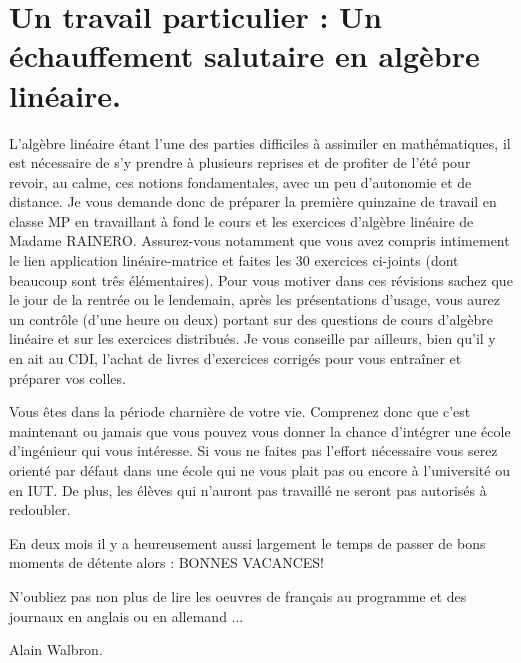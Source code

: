 \section*{Un travail particulier : Un échauffement salutaire en algèbre linéaire.}
L'algèbre linéaire étant l'une des parties difficiles à assimiler en mathématiques, il est nécessaire de s'y prendre
à plusieurs reprises et de profiter de l'été pour revoir, au calme, ces notions fondamentales, avec un peu
d'autonomie et de distance. Je vous demande donc de préparer la première quinzaine de travail en classe
MP en travaillant à fond le cours et les exercices d'algèbre linéaire de Madame RAINERO. Assurez-vous
notamment que vous avez compris intimement le lien application linéaire-matrice et faites les 30 exercices
ci-joints (dont beaucoup sont três élémentaires).
Pour vous motiver dans ces révisions sachez que le jour de la rentrée ou le lendemain, après les présentations
d'usage, vous aurez un contrôle (d'une heure ou deux) portant sur des questions de cours d'algèbre linéaire et
sur les exercices distribués.
Je vous conseille par ailleurs, bien qu'il y en ait au CDI, l'achat de livres d'exercices corrigés pour vous
entraîner et préparer vos colles.

Vous êtes dans la période charnière de votre vie. Comprenez donc que c'est maintenant ou jamais que vous
pouvez vous donner la chance d'intégrer une école d'ingénieur qui vous intéresse. Si vous ne faites pas l'effort
nécessaire vous serez orienté par défaut dans une école qui ne vous plait pas ou encore à l'université ou en IUT.
De plus, les élèves qui n'auront pas travaillé ne seront pas autorisés à redoubler.

En deux mois il y a heureusement aussi largement le temps de passer de bons moments de détente alors : BONNES VACANCES!

N'oubliez pas non plus de lire les oeuvres de français au programme et des journaux en anglais ou en allemand ...

Alain Walbron.
